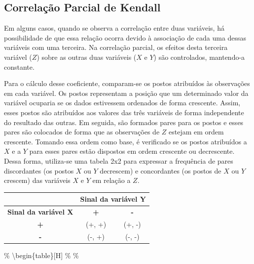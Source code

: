 \documentclass[
]{estat/estat}
\begin{document}
\hypertarget{correlauxe7uxe3o-parcial-de-kendall}{%
\subsection{Correlação Parcial de
Kendall}\label{correlauxe7uxe3o-parcial-de-kendall}}

Em alguns casos, quando se observa a correlação entre duas variáveis, há
possibilidade de que essa relação ocorra devido à associação de cada uma
dessas variáveis com uma terceira. Na correlação parcial, os efeitos
desta terceira variável (\(Z\)) sobre as outras duas variáveis (\(X\) e
\(Y\)) são controlados, mantendo-a constante.

Para o cálculo desse coeficiente, comparam-se os postos atribuídos às
observações em cada variável. Os postos representam a posição que um
determinado valor da variável ocuparia se os dados estivessem ordenados
de forma crescente. Assim, esses postos são atribuídos aos valores das
três variáveis de forma independente do resultado das outras. Em
seguida, são formados pares para os postos e esses pares são colocados
de forma que as observações de \(Z\) estejam em ordem crescente. Tomando
essa ordem como base, é verificado se os postos atribuídos a \(X\) e a
\(Y\) para esses pares estão dispostos em ordem crescente ou
decrescente. Dessa forma, utiliza-se uma tabela 2x2 para expressar a
frequência de pares discordantes (os postos \(X\) ou \(Y\) decrescem) e
concordantes (os postos de \(X\) ou \(Y\) crescem) das variáveis \(X\) e
\(Y\) em relação a \(Z\).

\begin{table}[H]
\centering
\begin{tabular}{c|cc}
\multicolumn{1}{l|}{}        & \multicolumn{2}{c}{\textbf{Sinal da variável Y}} \\ \midrule
\textbf{Sinal da variável X} & \textbf{+}              & \textbf{-}             \\ \midrule
\textbf{+}                   & (+, +)                  & (+, -)                 \\
\textbf{-}                   & (-, +)                  & (-, -)     
\end{tabular}
\end{table}

\% \textbackslash begin\{table\}{[}H{]} \% \centering \%
\end{document}
